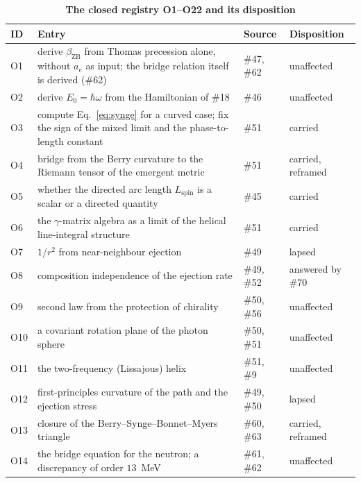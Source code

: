 \documentclass[%
 reprint, amsmath,amssymb, aps, prb, ]{revtex4-2}
\numberwithin{equation}{section}
\newcommand{\betaZB}{\beta_{\text{ZB}}}
\begin{document}
\begin{table}[p]
\centering
\caption{\textbf{The closed registry O1--O22 and its disposition}}
\label{tab:registry}
\renewcommand{\arraystretch}{1.22}
\setlength{\tabcolsep}{6pt}
\begin{tabular}{>{\raggedright\arraybackslash}p{0.7cm}>{\raggedright\arraybackslash}p{10.2cm}>{\raggedright\arraybackslash}p{2.2cm}>{\raggedright\arraybackslash}p{2.6cm}}
\toprule
\textbf{ID} & \textbf{Entry} & \textbf{Source} & \textbf{Disposition} \\
\midrule
O1 & derive $\betaZB$ from Thomas precession alone, without $a_e$ as input; the bridge relation itself is derived (\#62) & \#47, \#62 & unaffected \\
O2 & derive $E_0 = \hbar\omega$ from the Hamiltonian of \#18 & \#46 & unaffected \\
O3 & compute Eq.~\eqref{eq:synge} for a curved case; fix the sign of the mixed limit and the phase-to-length constant & \#51 & \textcolor{pass}{carried} \\
O4 & bridge from the Berry curvature to the Riemann tensor of the emergent metric & \#51 & \textcolor{pass}{carried}, reframed \\
O5 & whether the directed arc length $L_{\text{spin}}$ is a scalar or a directed quantity & \#45 & \textcolor{pass}{carried} \\
O6 & the $\gamma$-matrix algebra as a limit of the helical line-integral structure & \#51 & \textcolor{pass}{carried} \\
O7 & $1/r^{2}$ from near-neighbour ejection & \#49 & \textcolor{fail}{lapsed} \\
O8 & composition independence of the ejection rate & \#49, \#52 & \textcolor{fail}{answered by \#70} \\
O9 & second law from the protection of chirality & \#50, \#56 & unaffected \\
O10 & a covariant rotation plane of the photon sphere & \#50, \#51 & unaffected \\
O11 & the two-frequency (Lissajous) helix & \#51, \#9 & unaffected \\
O12 & first-principles curvature of the path and the ejection stress & \#49, \#50 & \textcolor{fail}{lapsed} \\
O13 & closure of the Berry--Synge--Bonnet--Myers triangle & \#60, \#63 & \textcolor{pass}{carried}, reframed \\
O14 & the bridge equation for the neutron; a discrepancy of order $13$~MeV & \#61, \#62 & unaffected \\

\end{tabular}
\end{table}
\end{document}
